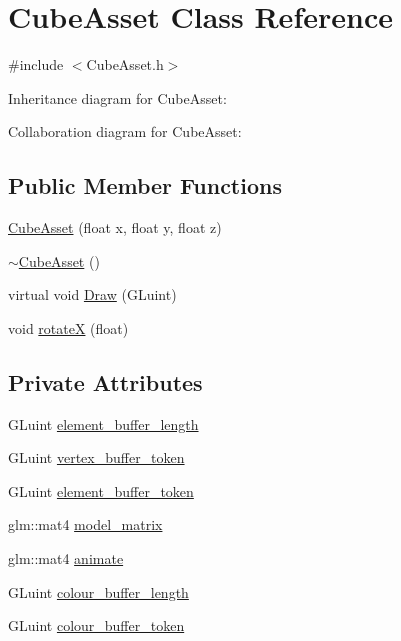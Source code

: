 \hypertarget{class_cube_asset}{}\section{Cube\+Asset Class Reference}
\label{class_cube_asset}


{\ttfamily \#include $<$Cube\+Asset.\+h$>$}



Inheritance diagram for Cube\+Asset\+:


Collaboration diagram for Cube\+Asset\+:
\subsection*{Public Member Functions}
\begin{DoxyCompactItemize}
\item 
\hyperlink{class_cube_asset_ad75b73237824794b0822c3404c554523}{Cube\+Asset} (float x, float y, float z)
\item 
\hyperlink{class_cube_asset_ab3ab9a5da82cbf8537a28652410093b1}{$\sim$\+Cube\+Asset} ()
\item 
virtual void \hyperlink{class_cube_asset_a1af568486056e254ffcf98fd99947bfe}{Draw} (G\+Luint)
\item 
void \hyperlink{class_cube_asset_ad3bd98dd1b0a34b3dc4234913e41c3e5}{rotate\+X} (float)
\end{DoxyCompactItemize}
\subsection*{Private Attributes}
\begin{DoxyCompactItemize}
\item 
G\+Luint \hyperlink{class_cube_asset_ac66c2ec869f392515dad4ebda1fe4792}{element\+\_\+buffer\+\_\+length}
\item 
G\+Luint \hyperlink{class_cube_asset_a31bd098f60e2c24988316a9cc9335987}{vertex\+\_\+buffer\+\_\+token}
\item 
G\+Luint \hyperlink{class_cube_asset_a4fae699256e7c5633a8174a93ca8a0ec}{element\+\_\+buffer\+\_\+token}
\item 
glm\+::mat4 \hyperlink{class_cube_asset_a49b69783f209cc8268a8be7d46c803d6}{model\+\_\+matrix}
\item 
glm\+::mat4 \hyperlink{class_cube_asset_abedd75ebec41780de46911157cc88a28}{animate}
\item 
G\+Luint \hyperlink{class_cube_asset_a12de81acb020b82bd26cda6284910012}{colour\+\_\+buffer\+\_\+length}
\item 
G\+Luint \hyperlink{class_cube_asset_a75f98d346175cd91cdee04f1885f5327}{colour\+\_\+buffer\+\_\+token}
\end{DoxyCompactItemize}


